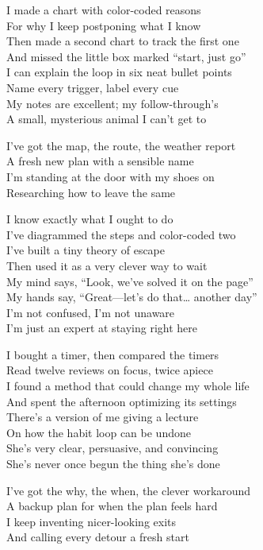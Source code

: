 \begin{lyrics}
I made a chart with color-coded reasons\\
For why I keep postponing what I know\\
Then made a second chart to track the first one\\
And missed the little box marked “start, just go”\\
I can explain the loop in six neat bullet points\\
Name every trigger, label every cue\\
My notes are excellent; my follow-through’s\\
A small, mysterious animal I can’t get to

I’ve got the map, the route, the weather report\\
A fresh new plan with a sensible name\\
I’m standing at the door with my shoes on\\
Researching how to leave the same

I know exactly what I ought to do\\
I’ve diagrammed the steps and color-coded two\\
I’ve built a tiny theory of escape\\
Then used it as a very clever way to wait\\
My mind says, “Look, we’ve solved it on the page”\\
My hands say, “Great—let’s do that… another day”\\
I’m not confused, I’m not unaware\\
I’m just an expert at staying right here

I bought a timer, then compared the timers\\
Read twelve reviews on focus, twice apiece\\
I found a method that could change my whole life\\
And spent the afternoon optimizing its settings\\
There’s a version of me giving a lecture\\
On how the habit loop can be undone\\
She’s very clear, persuasive, and convincing\\
She’s never once begun the thing she’s done

I’ve got the why, the when, the clever workaround\\
A backup plan for when the plan feels hard\\
I keep inventing nicer-looking exits\\
And calling every detour a fresh start


\end{lyrics}
